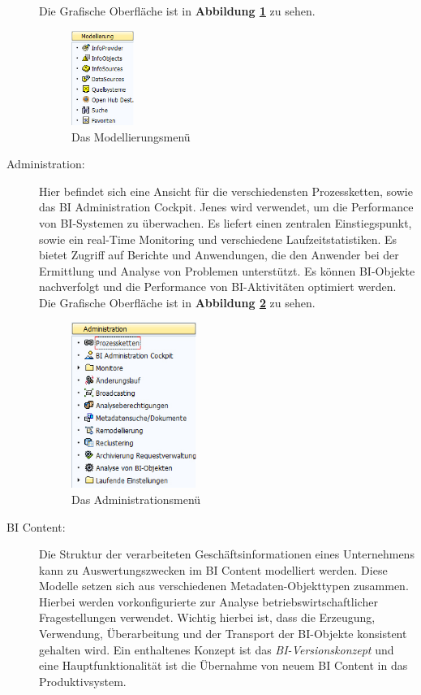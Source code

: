 \begin{description}
\begin{itemize}
\end{itemize}
Die Grafische Oberfläche ist in  \textbf{Abbildung \ref{pic:Modellierung}}  zu sehen.
\begin{figure}[H]
    \centering
    \includegraphics[width=0.2\textwidth]{files/Modellierung}
    \caption{Das Modellierungsmenü}
    \label{pic:Modellierung}
\end{figure}
\item[Administration:] Hier befindet sich eine Ansicht für die verschiedensten Prozessketten, sowie das BI Administration Cockpit. Jenes wird verwendet, um die Performance von BI-Systemen zu überwachen. Es liefert einen zentralen Einstiegspunkt, sowie ein real-Time Monitoring und verschiedene Laufzeitstatistiken. Es bietet Zugriff auf Berichte und Anwendungen, die den Anwender bei der Ermittlung und Analyse von Problemen unterstützt. Es können BI-Objekte nachverfolgt und die Performance von BI-Aktivitäten optimiert werden.
Die Grafische Oberfläche ist in  \textbf{Abbildung \ref{pic:Administration}}  zu sehen.
\begin{figure}[H]
    \centering
    \includegraphics[width=0.4\textwidth]{files/Administration}
    \caption{Das Administrationsmenü}
    \label{pic:Administration}
\end{figure}
\item[BI Content:] Die Struktur der verarbeiteten Geschäftsinformationen eines Unternehmens kann zu Auswertungszwecken im BI Content modelliert werden. Diese Modelle setzen sich aus verschiedenen Metadaten-Objekttypen zusammen. Hierbei werden vorkonfigurierte zur Analyse betriebswirtschaftlicher Fragestellungen verwendet. Wichtig hierbei ist, dass die Erzeugung, Verwendung, Überarbeitung und der Transport der BI-Objekte konsistent gehalten wird. Ein enthaltenes Konzept ist das \textit{BI-Versionskonzept} und eine Hauptfunktionalität ist die Übernahme von neuem BI Content in das Produktivsystem.

\end{description}
